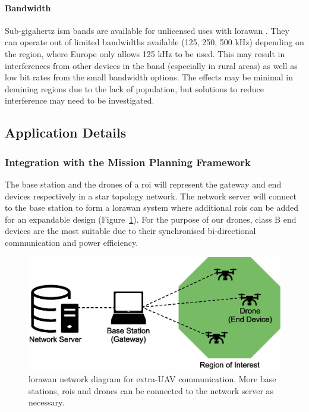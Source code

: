 \paragraph{Bandwidth} Sub-gigahertz \gls{ism} bands are available for unlicensed uses with \gls{lorawan} \cite{stokking2021lorawan}. They can operate out of limited bandwidths available (125, 250, 500 kHz) depending on the region, where Europe only allows 125 kHz to be used. This may result in interferences from other devices in the band (especially in rural areas) as well as low bit rates from the small bandwidth options. The effects may be minimal in demining regions due to the lack of population, but solutions to reduce interference may need to be investigated. 

\subsection{Application Details}
\label{sec:euc_application}

\subsubsection{Integration with the Mission Planning Framework}

The base station and the drones of a \gls{roi} will represent the gateway and end devices respectively in a star topology network. The network server will connect to the base station to form a \gls{lorawan} system where additional \gls{roi}s can be added for an expandable design (Figure~\ref{fig:euc_network_diagram}). For the purpose of our drones, class B end devices are the most suitable due to their synchronised bi-directional communication and power efficiency. 

\begin{figure}[h!]
    \centering
    \includegraphics[width=0.7\linewidth]{figs/Jihwan/Network Diagram of LoRa.eps}
    \caption[LoRaWAN Network Diagram for Extra-UAV Communication]
    {\gls{lorawan} network diagram for extra-\gls{UAV} communication. More base stations, \gls{roi}s and drones can be connected to the network server as necessary.}
    \label{fig:euc_network_diagram}
\end{figure}

